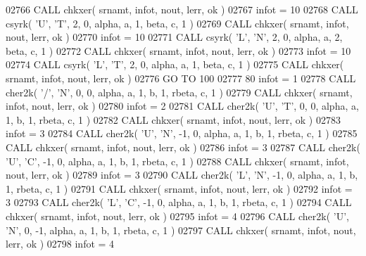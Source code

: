 \begin{DoxyCode}
02766       \textcolor{keyword}{CALL }chkxer( srnamt, infot, nout, lerr, ok )
02767       infot = 10
02768       \textcolor{keyword}{CALL }csyrk( \textcolor{stringliteral}{'U'}, \textcolor{stringliteral}{'T'}, 2, 0, alpha, a, 1, beta, c, 1 )
02769       \textcolor{keyword}{CALL }chkxer( srnamt, infot, nout, lerr, ok )
02770       infot = 10
02771       \textcolor{keyword}{CALL }csyrk( \textcolor{stringliteral}{'L'}, \textcolor{stringliteral}{'N'}, 2, 0, alpha, a, 2, beta, c, 1 )
02772       \textcolor{keyword}{CALL }chkxer( srnamt, infot, nout, lerr, ok )
02773       infot = 10
02774       \textcolor{keyword}{CALL }csyrk( \textcolor{stringliteral}{'L'}, \textcolor{stringliteral}{'T'}, 2, 0, alpha, a, 1, beta, c, 1 )
02775       \textcolor{keyword}{CALL }chkxer( srnamt, infot, nout, lerr, ok )
02776       \textcolor{keywordflow}{GO TO} 100
02777    80 infot = 1
02778       \textcolor{keyword}{CALL }cher2k( \textcolor{stringliteral}{'/'}, \textcolor{stringliteral}{'N'}, 0, 0, alpha, a, 1, b, 1, rbeta, c, 1 )
02779       \textcolor{keyword}{CALL }chkxer( srnamt, infot, nout, lerr, ok )
02780       infot = 2
02781       \textcolor{keyword}{CALL }cher2k( \textcolor{stringliteral}{'U'}, \textcolor{stringliteral}{'T'}, 0, 0, alpha, a, 1, b, 1, rbeta, c, 1 )
02782       \textcolor{keyword}{CALL }chkxer( srnamt, infot, nout, lerr, ok )
02783       infot = 3
02784       \textcolor{keyword}{CALL }cher2k( \textcolor{stringliteral}{'U'}, \textcolor{stringliteral}{'N'}, -1, 0, alpha, a, 1, b, 1, rbeta, c, 1 )
02785       \textcolor{keyword}{CALL }chkxer( srnamt, infot, nout, lerr, ok )
02786       infot = 3
02787       \textcolor{keyword}{CALL }cher2k( \textcolor{stringliteral}{'U'}, \textcolor{stringliteral}{'C'}, -1, 0, alpha, a, 1, b, 1, rbeta, c, 1 )
02788       \textcolor{keyword}{CALL }chkxer( srnamt, infot, nout, lerr, ok )
02789       infot = 3
02790       \textcolor{keyword}{CALL }cher2k( \textcolor{stringliteral}{'L'}, \textcolor{stringliteral}{'N'}, -1, 0, alpha, a, 1, b, 1, rbeta, c, 1 )
02791       \textcolor{keyword}{CALL }chkxer( srnamt, infot, nout, lerr, ok )
02792       infot = 3
02793       \textcolor{keyword}{CALL }cher2k( \textcolor{stringliteral}{'L'}, \textcolor{stringliteral}{'C'}, -1, 0, alpha, a, 1, b, 1, rbeta, c, 1 )
02794       \textcolor{keyword}{CALL }chkxer( srnamt, infot, nout, lerr, ok )
02795       infot = 4
02796       \textcolor{keyword}{CALL }cher2k( \textcolor{stringliteral}{'U'}, \textcolor{stringliteral}{'N'}, 0, -1, alpha, a, 1, b, 1, rbeta, c, 1 )
02797       \textcolor{keyword}{CALL }chkxer( srnamt, infot, nout, lerr, ok )
02798       infot = 4

\end{DoxyCode}
